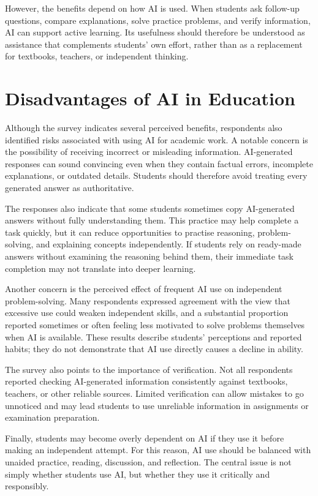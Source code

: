 \documentclass[12pt,a4paper]{article}
\begin{document}
However, the benefits depend on how AI is used. When students ask follow-up questions, compare explanations, solve practice problems, and verify information, AI can support active learning. Its usefulness should therefore be understood as assistance that complements students' own effort, rather than as a replacement for textbooks, teachers, or independent thinking.

\section{Disadvantages of AI in Education}
\label{sec:disadvantages-ai}

Although the survey indicates several perceived benefits, respondents also identified risks associated with using AI for academic work. A notable concern is the possibility of receiving incorrect or misleading information. AI-generated responses can sound convincing even when they contain factual errors, incomplete explanations, or outdated details. Students should therefore avoid treating every generated answer as authoritative.

The responses also indicate that some students sometimes copy AI-generated answers without fully understanding them. This practice may help complete a task quickly, but it can reduce opportunities to practise reasoning, problem-solving, and explaining concepts independently. If students rely on ready-made answers without examining the reasoning behind them, their immediate task completion may not translate into deeper learning.

Another concern is the perceived effect of frequent AI use on independent problem-solving. Many respondents expressed agreement with the view that excessive use could weaken independent skills, and a substantial proportion reported sometimes or often feeling less motivated to solve problems themselves when AI is available. These results describe students' perceptions and reported habits; they do not demonstrate that AI use directly causes a decline in ability.

The survey also points to the importance of verification. Not all respondents reported checking AI-generated information consistently against textbooks, teachers, or other reliable sources. Limited verification can allow mistakes to go unnoticed and may lead students to use unreliable information in assignments or examination preparation.

Finally, students may become overly dependent on AI if they use it before making an independent attempt. For this reason, AI use should be balanced with unaided practice, reading, discussion, and reflection. The central issue is not simply whether students use AI, but whether they use it critically and responsibly.
\end{document}
